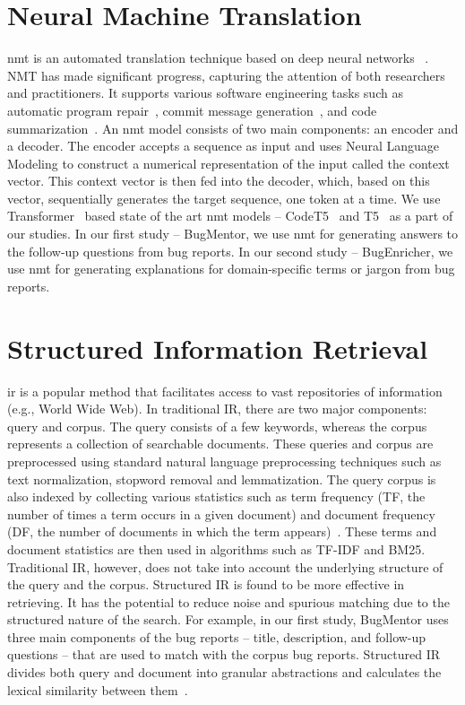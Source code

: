 \section{Neural Machine Translation}\label{background:NMT}

\acrfull{nmt} is an automated translation technique based on deep neural networks ~\cite{wu2016google}. NMT has made significant progress, capturing the attention of both researchers and practitioners. It supports various software engineering tasks such as automatic program repair~\cite{lutellier2020coconut,jiang2021cure}, commit message generation~\cite{jiang2019boosting}, and code summarization~\cite{leclair2019neural}. An \acrshort{nmt} model consists of two main components: an encoder and a decoder. The encoder accepts a sequence as input and uses Neural Language Modeling to construct a numerical representation of the input called the context vector. This context vector is then fed into the decoder, which, based on this vector, sequentially generates the target sequence, one token at a time. We use Transformer~\cite{raffel2020exploring,vaswani2017attention} based state of the art \acrshort{nmt} models -- CodeT5~\cite{wang2021codet5} and T5~\cite{raffel2020exploring} as a part of our studies. In our first study -- BugMentor, we use \acrshort{nmt} for generating answers to the follow-up questions from bug reports. In our second study -- BugEnricher, we use \acrshort{nmt} for generating explanations for domain-specific terms or jargon from bug reports.\par


\section{Structured Information Retrieval} \label{background:StructuredIR}

\acrfull{ir} is a popular method that facilitates access to vast repositories of information (e.g., World Wide Web).
In traditional IR, there are two major components: query and corpus. The query consists of a few keywords, whereas the corpus represents a collection of searchable documents. These queries and corpus are preprocessed using standard natural language preprocessing techniques such as text normalization, stopword removal and lemmatization. The query corpus is also indexed by collecting various statistics such as term frequency (TF, the number of times a term occurs in a given document) and document frequency (DF, the number of documents in which the term appears)~\cite{saha2013improving}. These terms and document statistics are then used in algorithms such as TF-IDF and BM25. Traditional IR, however, does not take into account the underlying structure of the query and the corpus. Structured IR is found to be more effective in retrieving. It has the potential to reduce noise and spurious matching due to the structured nature of the search. For example, in our first study, BugMentor uses three main components of the bug reports -- title, description, and follow-up questions -- that are used to match with the corpus bug reports. Structured IR divides both query and document into granular abstractions and calculates the lexical similarity between them~\cite{saha2013improving}.
   

